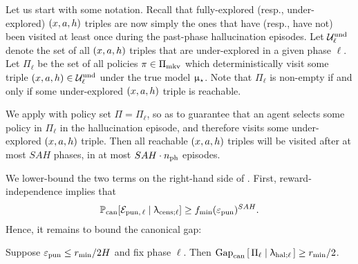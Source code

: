Let us start with some notation. Recall that fully-explored (resp., under-explored) $(x,a,h)$ triples are now simply the ones that have (resp., have not) been visited at least once during the past-phase hallucination episodes. Let $\mathcal{U}^{\mathrm{und}}_{\ell}$ denote the set of all $(x,a,h)$ triples that are under-explored in a given phase $\ell$. Let $\Pi_{\ell}$ be the set of all policies $\pi\in \Pi_{\mathrm{mkv}}$ which deterministically visit some triple $(x,a,h)\in \mathcal{U}^{\mathrm{und}}_{\ell}$ under the true model $\upmu_{\star}$. Note that $\Pi_\ell$ is non-empty if and only if some under-explored $(x,a,h)$ triple is reachable.



We apply  with policy set $\Pi = \Pi_\ell$, so as to guarantee that an agent selects some policy in $\Pi_\ell$ in the hallucination episode, and therefore visits some under-explored $(x,a,h)$ triple. Then all reachable $(x,a,h)$ triples will be visited after at most $SAH$ phases, \ie in at most $SAH \cdot n_{\mathrm{ph}}$ episodes.

We lower-bound the two terms on the right-hand side of . First, 
reward-independence implies that
\begin{align*}
\operatorname{\mathbb{P}}_{\mathrm{can}}[\mathcal{E}_{\mathrm{pun},\,\ell} \mid \uplambda_{\mathrm{cens};\ell}] \ge f_{\min}(\varepsilon_{\mathrm{pun}})^{SAH}.
\end{align*}
Hence, it remains to bound the canonical gap:

\begin{claim}\label{claim:gap_size}
Suppose $\varepsilon_{\mathrm{pun}} \le r_{\min}/2H$ and fix phase $\ell$. Then
    $\mathrm{Gap}_{\mathrm{can}}\left[\,\Pi_{\ell} \mid \uplambda_{\mathrm{hal};\ell}\,\right] \geq r_{\min}/2$.
\end{claim}

